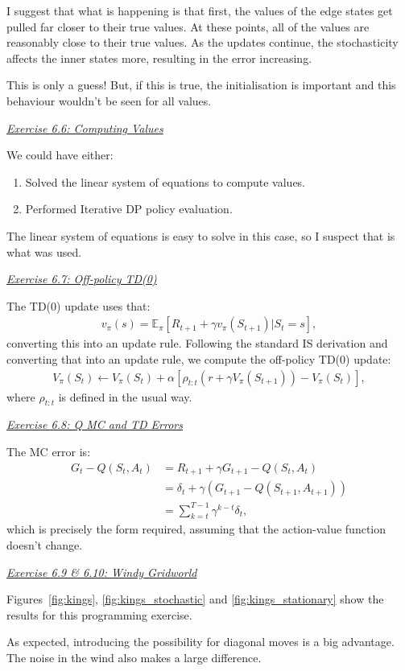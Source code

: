 \documentclass{article}
\newcommand{\myq}[1]{%
	\vspace{1em}
	\noindent\underline{\emph{Exercise #1}}\vspace{0.25em}\linebreak
}
\begin{document}
I suggest that what is happening is that first, the values of the edge states get pulled far closer to their true values. At these points, all of the values are reasonably close to their true values.  As the updates continue, the stochasticity affects the inner states more, resulting in the error increasing. 

This is only a guess! But, if this is true, the initialisation is important and this behaviour wouldn't be seen for all values. 

\myq{6.6: Computing Values}
We could have either:
\begin{enumerate}
	\item Solved the linear system of equations to compute values. 
	\item Performed Iterative DP policy evaluation.
\end{enumerate}
The linear system of equations is easy to solve in this case, so I suspect that is what was used. 

\myq{6.7: Off-policy TD(0)}
The TD(0) update uses that:
\begin{align}
v_\pi(s) = \mathbb{E}_\pi [ R_{t+1} + \gamma v_\pi(S_{t+1}) | S_t = s],
\end{align}
converting this into an update rule. Following the standard IS derivation and converting that into an update rule, we compute the off-policy TD(0) update:
\begin{align}
V_\pi(S_t) \leftarrow V_\pi(S_t) + \alpha [\rho_{t:t} (r + \gamma V_\pi(S_{t+1})) - V_\pi(S_t)],
\end{align}
where $\rho_{t:t}$ is defined in the usual way. 

\myq{6.8: Q MC and TD Errors}
The MC error is:
\begin{align}
G_t - Q(S_t, A_t) &= R_{t+1} + \gamma G_{t+1} - Q(S_t, A_t) \nonumber \\
&= \delta_t + \gamma (G_{t+1} - Q(S_{t+1}, A_{t+1 })) \nonumber \\
&= \sum_{k=t}^{T-1} \gamma^{k-t} \delta_t,
\end{align}
which is precisely the form required, assuming that the action-value function doesn't change. 

\myq{6.9 \& 6.10: Windy Gridworld}
Figures~\ref{fig:kings}, \ref{fig:kings_stochastic} and \ref{fig:kings_stationary} show the results for this programming exercise. 

As expected, introducing the possibility for diagonal moves is a big advantage. The noise in the wind also makes a large difference. 
\end{document}
